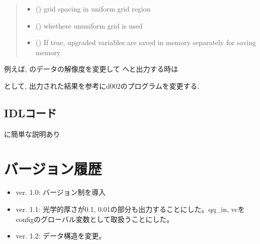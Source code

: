 \documentclass[letterpaper,10pt,dvipdfmx,report]{sphinxmanual}
\begin{document}
\begin{fulllineitems}
\begin{quote}
\begin{description}
\begin{itemize}
\item {} 
 () \sphinxhyphen{}\sphinxhyphen{} grid spacing in uniform grid region

\item {} 
 () \sphinxhyphen{}\sphinxhyphen{} whethere ununiform grid is used

\item {} 
 () \sphinxhyphen{}\sphinxhyphen{} If true, upgraded variables are saved in memory separately for saving memory

\end{itemize}

\end{description}\end{quote}

\end{fulllineitems}


例えば,  のデータの解像度を変更して  へと出力する時は

\begin{sphinxVerbatim}[commandchars=\\\{\}]
  
\end{sphinxVerbatim}

として, 出力された結果を参考にd002のプログラムを変更する.


\subsection{IDLコード}
\label{\detokenize{io:idl}}
 に簡単な説明あり


\section{バージョン履歴}
\label{\detokenize{io:id8}}\begin{itemize}
\item {} 
ver. 1.0: バージョン制を導入

\item {} 
ver. 1.1: 光学的厚さが0.1, 0.01の部分も出力することにした。qq\_in, vcをconfigのグローバル変数として取扱うことにした。

\item {} 
ver. 1.2: データ構造を変更。

\end{itemize}
\end{document}
